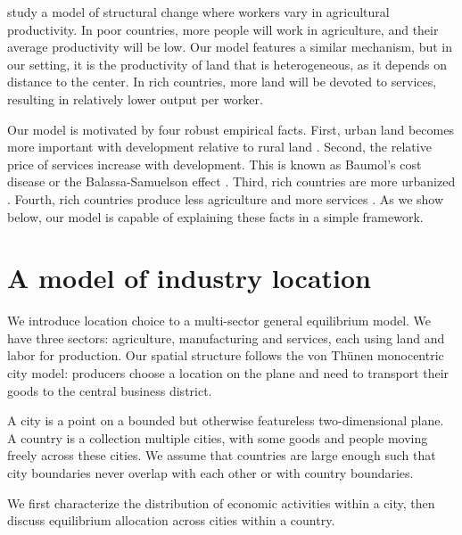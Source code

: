\documentclass[12pt]{article}
\begin{document}
 study a model of structural change where workers vary in agricultural productivity. In poor countries, more people will work in agriculture, and their average productivity will be low. Our model features a similar mechanism, but in our setting, it is the productivity of land that is heterogeneous, as it depends on distance to the center. In rich countries, more land will be devoted to services, resulting in relatively lower output per worker.

Our model is motivated by four robust empirical facts. First, urban land becomes more important with development relative to rural land \cite[Figure 10.3]{Clark}. Second, the relative price of services increase with development. This is known as Baumol's cost disease \cite{Baumol65} or the Balassa-Samuelson effect \cite{Balassa64,Samuelson64}. Third, rich countries are more urbanized \cite{United_Nations2014-zm}. Fourth, rich countries produce less agriculture and more services \cite{Kuznets1973,Ngai2007,Kongsamut2001}. As we show below, our model is capable of explaining these facts in a simple framework.


\section{A model of industry location}
We introduce location choice to a multi-sector general equilibrium model. We have three sectors: agriculture, manufacturing and services, each using land and labor for production. Our spatial structure follows the von Thünen monocentric city model: producers choose a location on the plane and need to transport their goods to the central business district. 

A city is a point on a bounded but otherwise featureless two-dimensional plane. A country is a collection multiple cities, with some goods and people moving freely across these cities. We assume that countries are large enough such that city boundaries never overlap with each other or with country boundaries.

We first characterize the distribution of economic activities within a city, then discuss equilibrium allocation across cities within a country.
\end{document}

